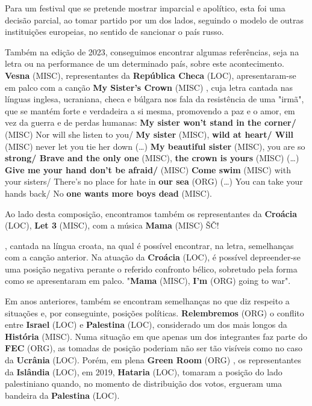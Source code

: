 \documentclass[12pt,a4paper]{article}
\begin{document}
Para  um  festival  que  se  pretende  mostrar  imparcial  e  apolítico,  esta  foi  uma  decisão parcial,  ao  tomar  partido  por  um  dos  lados,  seguindo  o  modelo  de  outras  instituições europeias, no sentido de sancionar o país russo.

Também na edição de 2023, conseguimos encontrar algumas referências, seja na letra  ou  na performance de  um  determinado  país,  sobre  este  acontecimento.  \textbf{Vesna} (MISC), representantes da \textbf{República Checa} (LOC), apresentaram-se em palco com a canção \textbf{My Sister's Crown} (MISC) ,  cuja  letra  cantada  nas  línguas  inglesa,  ucraniana,  checa  e  búlgara  nos  fala  da resistência de uma "irmã", que se mantém forte e verdadeira a si mesma, promovendo a paz e o amor, em vez da guerra e de perdas humanas: \textbf{My sister won't stand in the corner/} (MISC) Nor will she listen to you/ \textbf{My sister} (MISC), \textbf{wild at heart/ Will} (MISC) never let you tie her down (…) \textbf{My beautiful sister} (MISC), you are so \textbf{strong/ Brave and the only one} (MISC), \textbf{the crown is yours} (MISC) (…) \textbf{Give me your hand don't be afraid/} (MISC) \textbf{Come swim} (MISC) with your sisters/ There's no place for hate in \textbf{our sea} (ORG) (…) You can take your hands back/ No \textbf{one wants more boys dead} (MISC).

Ao  lado  desta  composição,  encontramos  também  os  representantes  da  \textbf{Croácia} (LOC), \textbf{Let 3} (MISC), com a música \textbf{Mama} (MISC) ŠČ!

, cantada na língua croata, na qual é possível encontrar, na  letra,  semelhanças  com  a  canção  anterior.  Na  atuação  da  \textbf{Croácia} (LOC),  é  possível depreender-se uma posição negativa perante o referido confronto bélico, sobretudo pela forma como se apresentaram em palco. "\textbf{Mama} (MISC), \textbf{I'm} (ORG) going to war".

Em  anos  anteriores,  também  se  encontram  semelhanças  no  que  diz  respeito  a situações  e,  por  conseguinte,  posições  políticas. \textbf{Relembremos} (ORG)  o  conflito entre  \textbf{Israel} (LOC)  e \textbf{Palestina} (LOC), considerado um dos mais longos da \textbf{História} (MISC). Numa situação em que apenas um dos integrantes faz parte do \textbf{FEC} (ORG), as tomadas de posição poderiam  não ser tão visíveis como no caso da \textbf{Ucrânia} (LOC). Porém, em plena \textbf{Green Room} (ORG) , os representantes da \textbf{Islândia} (LOC), em  2019,  \textbf{Hataria} (LOC),  tomaram  a  posição  do  lado  palestiniano  quando,  no  momento  de distribuição dos votos, ergueram uma bandeira da \textbf{Palestina} (LOC).
\end{document}
